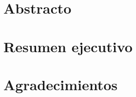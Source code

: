 \documentclass[12pt, oneside]{book}
\begin{document}
\chapter{Abstracto}

\chapter{Resumen ejecutivo}


\chapter{Agradecimientos}


\tableofcontents

\listoffigures

\mainmatter




% 



% 
\end{document}
